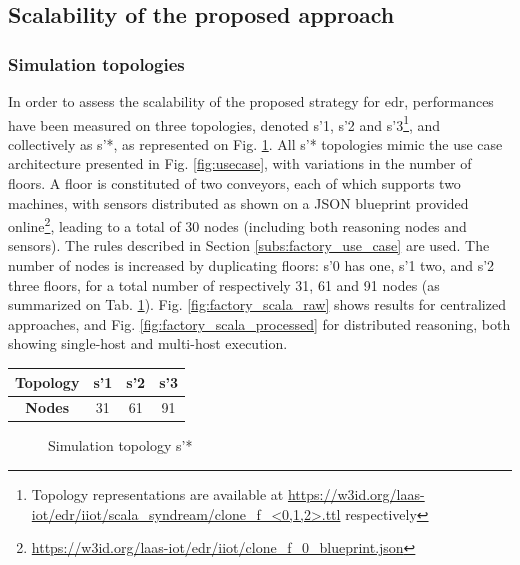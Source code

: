\documentclass{iosart2c}
\begin{document}
\subsection{Scalability of the proposed approach}
\label{subs:factory_scalability}
\subsubsection{Simulation topologies}

In order to assess the scalability of the proposed strategy for \gls{edr}, performances have been measured on three topologies, denoted s'1, s'2 and s'3\footnote{Topology representations are available at \url{https://w3id.org/laas-iot/edr/iiot/scala_syndream/clone_f_<0,1,2>.ttl} respectively}, and collectively as s'*, as represented on Fig. \ref{fig:factory_scala_topologies}. 
All s'* topologies mimic the use case architecture presented in Fig. \ref{fig:usecase}, with variations in the number of floors.
A floor is constituted of two conveyors, each of which supports two machines, with sensors distributed as shown on a JSON blueprint provided online\footnote{\url{https://w3id.org/laas-iot/edr/iiot/clone_f_0_blueprint.json}}, leading to a total of 30 nodes (including both reasoning nodes and sensors).
The rules described in Section \textsection \ref{subs:factory_use_case} are used.
The number of nodes is increased by duplicating floors: s'0 has one, s'1 two, and s'2 three floors, for a total number of respectively 31, 61 and 91 nodes (as summarized on Tab. \ref{tab:scalability_factory_size}).
Fig. \ref{fig:factory_scala_raw} shows results for centralized approaches, and Fig. \ref{fig:factory_scala_processed} for distributed reasoning, both showing single-host and multi-host execution.

\begin{table}
	\centering
	\label{tab:scalability_factory_size}
	\begin{tabular}{|c|c|c|c|}
		\hline 
		\textbf{Topology} 	& s'1 & s'2 & s'3 \\ \hline
		\textbf{Nodes} 		& 31 & 61 & 91 \\ \hline
	\end{tabular}
\end{table}

\begin{figure}
	\centering
	\caption{Simulation topology s'*}
	\label{fig:factory_scala_topologies}
	\scalebox{0.75}{
		
	}
\end{figure}
\end{document}
